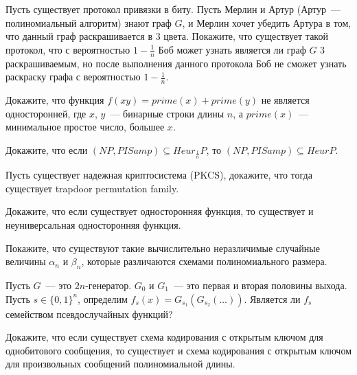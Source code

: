 \setcounter{curtask}{33}


\begin{task}
    Пусть существует протокол привязки в биту. Пусть Мерлин и Артур (Артур~---
    полиномиальный алгоритм) знают граф $G$, и Мерлин хочет убедить Артура в том, что
    данный граф раскрашивается в $3$ цвета. Покажите, что существует такой протокол,
    что с вероятностью $1 - \frac{1}{n}$ Боб может узнать является ли граф $G$ $3$
    раскрашиваемым, но после выполнения данного протокола Боб не сможет узнать
    раскраску графа с вероятностью $1 - \frac{1}{n}$.
\end{task}


\breakline

\begin{ptask}{12}
    Докажите, что функция $f(xy) = prime(x) + prime(y)$ не является односторонней,
    где $x$, $y$~--- бинарные строки длины $n$, а $prime(x)$~--- минимальное простое
    число, большее $x$.
\end{ptask}

\begin{ptask}{21}
    Докажите, что если $(NP, PISamp) \subseteq Heur_{\frac{1}{n}}P$, то $(NP, PISamp)
    \subseteq HeurP$.
\end{ptask}

\begin{ptask}{27}
    Пусть существует надежная криптосистема (PKCS), докажите, что тогда существует
    trapdoor permutation family.
\end{ptask}

\begin{ptask}{28}
    Докажите, что если существует односторонняя функция, то существует и
    неуниверсальная односторонняя функция.
\end{ptask}

\begin{ptask}{30}
    Покажите, что существуют такие вычислительно неразличимые случайные величины
    $\alpha_n$ и $\beta_n$, которые различаются схемами полиномиального размера.
\end{ptask}

\begin{ptask}{31}
    Пусть $G$~--- это $2n$-генератор. $G_0$ и $G_1$~--- это первая и вторая половины
    выхода. Пусть $s \in \{0, 1\}^n$, определим $f_s(x) =
    G_{s_1}(G_{s_2}(\dots))$. Является ли $f_s$ семейством псевдослучайных функций?
\end{ptask}

\begin{ptask}{32}
    Докажите, что если существует схема кодирования с открытым ключом для
    однобитового сообщения, то существует и схема кодирования с открытым ключом для
    произвольных сообщений полиномиальной длины.
\end{ptask}